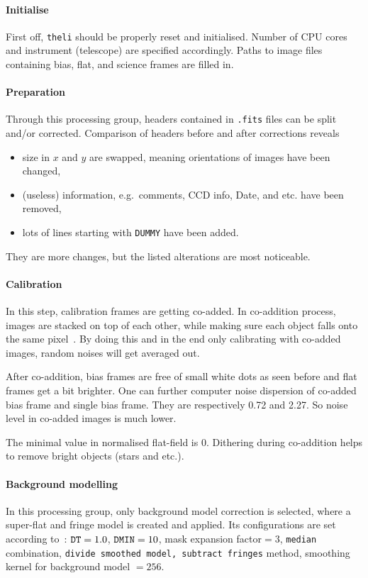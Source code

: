 \paragraph{Initialise}  First off, \verb|theli| should be properly reset and initialised. Number of CPU cores and instrument (telescope) are specified accordingly. Paths to image files containing bias, flat, and science frames are filled in.

\paragraph{Preparation}
Through this processing group, headers contained in \verb|.fits| files can be split and/or corrected. Comparison of headers before and after corrections reveals
\begin{itemize}
   \item size in $x$ and $y$ are swapped, meaning orientations of images have been changed,
   \item (useless) information, e.g.~comments, CCD info, Date, and etc. have been removed,
   \item lots of lines starting with \verb|DUMMY| have been added.
\end{itemize}
They are more changes, but the listed alterations are most noticeable.

\paragraph{Calibration}
In this step, calibration frames are getting co-added. In co-addition process, images are stacked on top of each other, while making sure each object falls onto the same pixel~\cite{manual}. By doing this and in the end only calibrating with co-added images, random noises will get averaged out.  

After co-addition, bias frames are free of small white dots as seen before and flat frames get a bit brighter. One can further computer noise dispersion of co-added bias frame and single bias frame. They are respectively \num{0.72} and \num{2.27}. So noise level in co-added images is much lower.

The minimal value in normalised flat-field is $0$. Dithering during co-addition helps to remove bright objects (stars and etc.).

\paragraph{Background modelling}
In this processing group, only background model correction is selected, where a super-flat and fringe model is created and applied. Its configurations are set according to~\cite{manual}: $\verb|DT| = 1.0$, $\verb|DMIN|=10$, mask expansion factor$=3$, \verb|median| combination, \verb|divide smoothed model, subtract fringes| method, smoothing kernel for background model $=256$.


